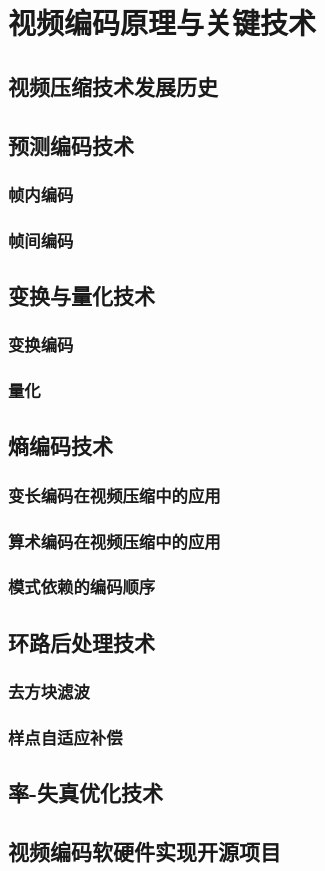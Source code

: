 \chapter{视频编码原理与关键技术}
\label{cha:c2}

\section{视频压缩技术发展历史}

\section{预测编码技术}
\subsection{帧内编码}
\subsection{帧间编码}

\section{变换与量化技术}
\subsection{变换编码}
\subsection{量化}

\section{熵编码技术}
\subsection{变长编码在视频压缩中的应用}
\subsection{算术编码在视频压缩中的应用}
\subsection{模式依赖的编码顺序}

\section{环路后处理技术}
\subsection{去方块滤波}
\subsection{样点自适应补偿}

\section{率-失真优化技术}

\section{视频编码软硬件实现开源项目}